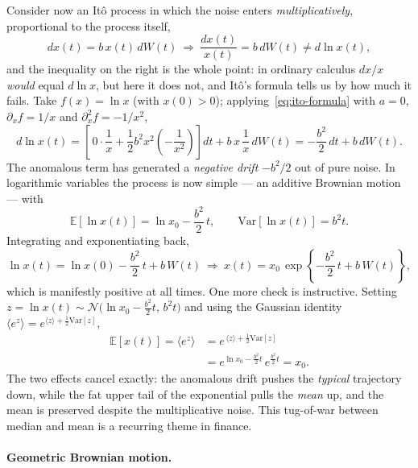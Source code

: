 Consider now an It\^o process in which the noise enters \emph{multiplicatively}, proportional to the process itself,
\begin{equation}
dx(t) = b\,x(t)\,dW(t) \ \Longrightarrow\ \frac{dx(t)}{x(t)} = b\,dW(t) \ne d\ln x(t),
\end{equation}
and the inequality on the right is the whole point: in ordinary calculus $dx/x$ \emph{would} equal $d\ln x$, but here it does not, and It\^o's formula tells us by how much it fails.
Take $f(x)=\ln x$ (with $x(0)>0$); applying~\eqref{eq:ito-formula} with $a=0$, $\partial_x f = 1/x$ and $\partial_x^2 f = -1/x^2$,
\begin{equation}
d\ln x(t) = \left[\,0\cdot\frac{1}{x} + \frac{1}{2}b^2 x^2\left(-\frac{1}{x^2}\right)\right]dt + b\,x\,\frac{1}{x}\,dW(t) = -\frac{b^2}{2}\,dt + b\,dW(t).
\end{equation}
The anomalous term has generated a \emph{negative drift} $-b^2/2$ out of pure noise.
In logarithmic variables the process is now simple --- an additive Brownian motion --- with
\begin{equation}
\mathbb{E}[\ln x(t)] = \ln x_0 - \frac{b^2}{2}\,t,\qquad \mathrm{Var}[\ln x(t)] = b^2 t.
\end{equation}
Integrating and exponentiating back,
\begin{equation}
\ln x(t) = \ln x(0) - \frac{b^2}{2}\,t + b\,W(t) \ \Longrightarrow\ x(t) = x_0\,\exp\!\left\{-\frac{b^2}{2}\,t + b\,W(t)\right\},
\end{equation}
which is manifestly positive at all times.
One more check is instructive.
Setting $z=\ln x(t)\sim\mathcal{N}\!\big(\ln x_0-\tfrac{b^2}{2}t,\,b^2 t\big)$ and using the Gaussian identity $\langle e^{z}\rangle = e^{\langle z\rangle + \frac{1}{2}\mathrm{Var}[z]}$,
\begin{equation}\begin{split}
\mathbb{E}[x(t)] = \langle e^{z}\rangle &= e^{\,\langle z\rangle + \frac{1}{2}\mathrm{Var}[z]}\\
&= e^{\ln x_0 - \frac{b^2}{2}t}\,e^{\frac{b^2}{2}t} = x_0.
\end{split}\end{equation}
The two effects cancel exactly: the anomalous drift pushes the \emph{typical} trajectory down, while the fat upper tail of the exponential pulls the \emph{mean} up, and the mean is preserved despite the multiplicative noise.
This tug-of-war between median and mean is a recurring theme in finance.

\paragraph*{Geometric Brownian motion.}

